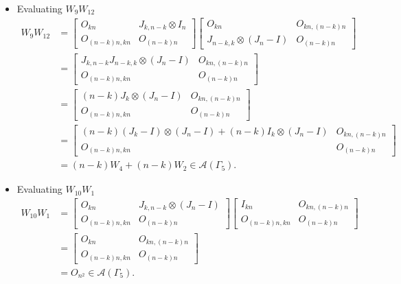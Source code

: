 \begin{itemize}
\item Evaluating $W_{9}W_{12}$
\begin{align*}
    W_9W_{12}
    &= \begin{bmatrix}
        O_{kn} & J_{k,n-k} \otimes I_n \\
        O_{(n-k)n,kn} & O_{(n-k)n}
    \end{bmatrix}
    \begin{bmatrix}
        O_{kn} & O_{kn, (n-k)n} \\
        J_{n-k, k}\otimes (J_n-I) & O_{(n-k)n}
    \end{bmatrix}\\
    &= \begin{bmatrix}
        J_{k,n-k}J_{n-k,k} \otimes (J_n-I) & O_{kn, (n-k)n} \\
        O_{(n-k)n,kn} & O_{(n-k)n}
    \end{bmatrix}\\
    &= \begin{bmatrix}
        (n-k)J_k\otimes (J_n-I) & O_{kn, (n-k)n} \\
        O_{(n-k)n,kn} & O_{(n-k)n}
    \end{bmatrix}\\
    &= \begin{bmatrix}
        (n-k)(J_k-I)\otimes (J_n-I) + (n-k)I_{k}\otimes (J_n-I) & O_{kn, (n-k)n} \\
        O_{(n-k)n,kn} & O_{(n-k)n}
    \end{bmatrix}\\
    &= (n-k)W_4 + (n-k)W_2\in\mathcal{A}(\Gamma_5).
\end{align*}

\item Evaluating $W_{10}W_{1}$
\begin{align*}
    W_{10}W_1
    &= \begin{bmatrix}
        O_{kn} & J_{k,n-k} \otimes (J_n-I) \\
        O_{(n-k)n,kn} & O_{(n-k)n}
    \end{bmatrix}
    \begin{bmatrix}
        I_{kn} & O_{kn, (n-k)n} \\
        O_{(n-k)n,kn} & O_{(n-k)n}
    \end{bmatrix}\\
    &= \begin{bmatrix}
        O_{kn} & O_{kn, (n-k)n} \\
        O_{(n-k)n,kn} & O_{(n - k)n}
    \end{bmatrix}\\
    &= O_{n^2} \in\mathcal{A}(\Gamma_5).
\end{align*}


\end{itemize}
